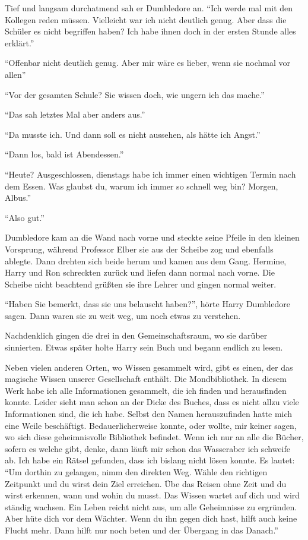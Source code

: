 Tief und langsam durchatmend sah er Dumbledore an. \enquote{Ich werde mal mit den Kollegen reden müssen. Vielleicht war ich nicht deutlich genug. \gst Aber dass die Schüler es nicht begriffen haben? Ich habe ihnen doch in der ersten Stunde alles erklärt.}

\enquote{Offenbar nicht deutlich genug. Aber mir wäre es lieber, wenn sie nochmal vor allen\abs}

\enquote{Vor der gesamten Schule? Sie wissen doch, wie ungern ich das mache.}

\enquote{Das sah letztes Mal aber anders aus.}

\enquote{Da musste ich. Und dann soll es nicht aussehen, als hätte ich Angst.}

\enquote{Dann los, bald ist Abendessen.}

\enquote{Heute? Ausgeschlossen, dienstags habe ich immer einen wichtigen Termin nach dem Essen. Was glaubst du, warum ich immer so schnell weg bin? Morgen, Albus.}

\enquote{Also gut.}

Dumbledore kam an die Wand nach vorne und steckte seine Pfeile in den kleinen Vorsprung, während Professor Elber sie aus der Scheibe zog und ebenfalls ablegte. Dann drehten sich beide herum und kamen aus dem Gang. Hermine, Harry und Ron schreckten zurück und liefen dann normal nach vorne. Die Scheibe nicht beachtend grüßten sie ihre Lehrer und gingen normal weiter.

\enquote{Haben Sie bemerkt, dass sie uns belauscht haben?}, hörte Harry Dumbledore sagen. Dann waren sie zu weit weg, um noch etwas zu verstehen.

Nachdenklich gingen die drei in den Gemeinschaftsraum, wo sie darüber sinnierten. Etwas später holte Harry sein Buch und begann endlich zu lesen.

\begin{buch}
Neben vielen anderen Orten, wo Wissen gesammelt wird, gibt es einen, der das magische Wissen unserer Gesellschaft enthält. Die Mondbibliothek. In diesem Werk habe ich alle Informationen gesammelt, die ich finden und herausfinden konnte. Leider sieht man schon an der Dicke des Buches, dass es nicht allzu viele Informationen sind, die ich habe. Selbst den Namen herauszufinden hatte mich eine Weile beschäftigt. Bedauerlicherweise konnte, oder wollte, mir keiner sagen, wo sich diese geheimnisvolle Bibliothek befindet. Wenn ich nur an alle die Bücher, sofern es welche gibt, denke, dann läuft mir schon das Wasser\abs aber ich schweife ab. Ich habe ein Rätsel gefunden, dass ich bislang nicht lösen konnte. Es lautet: \enquote{Um dorthin zu gelangen, nimm den direkten Weg. Wähle den richtigen Zeitpunkt und du wirst dein Ziel erreichen. Übe das Reisen ohne Zeit und du wirst erkennen, wann und wohin du musst. Das Wissen wartet auf dich und wird ständig wachsen. Ein Leben reicht nicht aus, um alle Geheimnisse zu ergründen. Aber hüte dich vor dem Wächter. Wenn du ihn gegen dich hast, hilft auch keine Flucht mehr. Dann hilft nur noch beten und der Übergang in das Danach.}
\end{buch}

